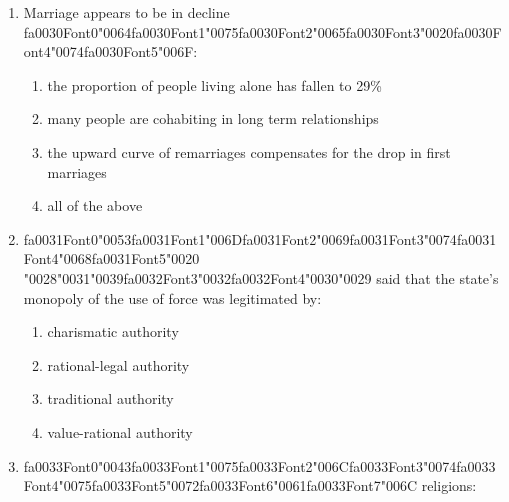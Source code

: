 \documentclass[12pt]{article}
\begin{document}
\begin{enumerate}[label=\arabic*.]
\begin{enumerate}[label=(\alph*)]
    \item there are no clearly defined projects into which the money can be directed
    \item the United Nations has refused to call on rich countries to provide it
    \item debt repayments with interest can be greater than the amount of money received
    \item debt repayments with interest can be greater than the amount of money received
\end{enumerate}
\item Marriage appears to be in decline {\csname fa0030Font0\endcsname\char"0064}{\csname fa0030Font1\endcsname\char"0075}{\csname fa0030Font2\endcsname\char"0065}{\csname fa0030Font3\endcsname\char"0020}{\csname fa0030Font4\endcsname\char"0074}{\csname fa0030Font5\endcsname\char"006F}:
\begin{enumerate}[label=(\alph*)]
    \item the proportion of people living alone has fallen to 29\%
    \item many people are cohabiting in long term relationships
    \item the upward curve of remarriages compensates for the drop in first marriages
    \item all of the above
\end{enumerate}
\item {\csname fa0031Font0\endcsname\char"0053}{\csname fa0031Font1\endcsname\char"006D}{\csname fa0031Font2\endcsname\char"0069}{\csname fa0031Font3\endcsname\char"0074}{\csname fa0031Font4\endcsname\char"0068}{\csname fa0031Font5\endcsname\char"0020} {\char"0028}{\char"0031}{\char"0039}{\csname fa0032Font3\endcsname\char"0032}{\csname fa0032Font4\endcsname\char"0030}{\char"0029} said that the state's monopoly of the use of force was legitimated by:
\begin{enumerate}[label=(\alph*)]
    \item charismatic authority
    \item rational-legal authority
    \item traditional authority
    \item value-rational authority
\end{enumerate}
\item {\csname fa0033Font0\endcsname\char"0043}{\csname fa0033Font1\endcsname\char"0075}{\csname fa0033Font2\endcsname\char"006C}{\csname fa0033Font3\endcsname\char"0074}{\csname fa0033Font4\endcsname\char"0075}{\csname fa0033Font5\endcsname\char"0072}{\csname fa0033Font6\endcsname\char"0061}{\csname fa0033Font7\endcsname\char"006C} religions:

\end{enumerate}
\end{document}

